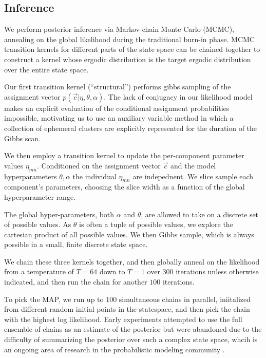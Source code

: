 \documentclass{article}
\begin{document}
\subsection{Inference} 
We perform posterior inference via Markov-chain Monte Carlo (MCMC),
annealing on the global likelihood during the traditional burn-in
phase. MCMC transition kernels for different parts of the state space
can be chained together to construct a kernel whose ergodic
distribution is the target ergodic distribution over the entire state space. 

Our first transition kernel (``structural'') performs gibbs sampling 
of the assignment vector $p(\vec{c} | \eta, \theta, \alpha)$. 
The lack of conjugacy in our likelihood model makes an explicit 
evaluation of the conditional assignment probabilities impossible, 
motivating us to use an auxiliary variable method \autocite{Neal2000}
in which a collection of ephemeral clusters are explicitly represented
for the duration of the Gibbs scan. 

We then employ a transition kernel to update the per-component
parameter values $\eta_{mn}$. Conditioned on the assignment vector
$\vec{c}$ and the model hyperparameters $\theta, \alpha$ the 
individual $\eta_{mn}$ are indepednent. We slice sample \autocite{Neal2003}
each component's parameters, choosing the slice width as a function
of the global hyperparameter range. 

The global hyper-parameters, both $\alpha$ and $\theta$, are allowed
to take on a discrete set of possible values. As $\theta$ is often a
tuple of possible values, we explore the cartesian product of all
possible values. We then Gibbs sample, which is always possible in a 
small, finite discrete state space. 

We chain these three kernels together, and then globally
anneal on the likelihood from a temperature of $T=64$ down to 
$T=1$ over 300 iterations unless otherwise indicated, and
then run the chain for another $100$ iterations. 

To pick the MAP, we run up to $100$ simultaneous chains in parallel,
iniitalized from different random initial points in the statespace,
and then pick the chain with the highest log likelihood. Early
experiments attempted to use the full ensemble of chains as an
estimate of the posterior but were abandoned due to the difficulty of
summarizing the posterior over such a complex state space, whcih is an
ongoing area of research in the probabilistic modeling community
\autocite{}.
\end{document}
